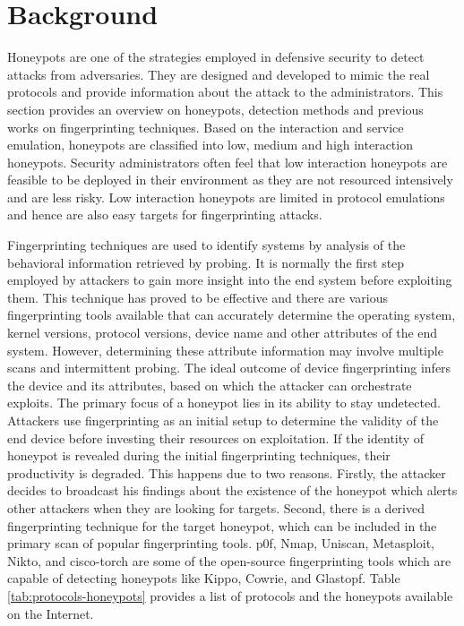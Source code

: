 \section{Background}
\label{sec:back}

Honeypots are one of the strategies employed in defensive security to detect attacks from adversaries. They are designed and developed to mimic the real protocols and provide information about the attack to the administrators. This section provides an overview on honeypots, detection methods and previous works on fingerprinting techniques. Based on the interaction and service emulation, honeypots are classified into low, medium and high interaction honeypots. Security administrators often feel that low interaction honeypots are feasible to be deployed in their environment as they are not resourced intensively and are less risky. Low interaction honeypots are limited in protocol emulations and hence are also easy targets for fingerprinting attacks. 

Fingerprinting techniques are used to identify systems by analysis of the behavioral information retrieved by probing. It is normally the first step employed by attackers to gain more insight into the end system before exploiting them. This technique has proved to be effective and there are various fingerprinting tools available that can accurately determine the operating system, kernel versions, protocol versions, device name and other attributes of the end system. However, determining these attribute information may involve multiple scans and intermittent probing. The ideal outcome of device fingerprinting infers the device and its attributes, based on which the attacker can orchestrate exploits. The primary focus of a honeypot lies in its ability to stay undetected. Attackers use fingerprinting as an initial setup to determine the validity of the end device before investing their resources on exploitation. If the identity of honeypot is revealed during the initial fingerprinting techniques, their productivity is degraded. This happens due to two reasons. Firstly, the attacker decides to broadcast his findings about the existence of the honeypot which alerts other attackers when they are looking for targets. Second, there is a derived fingerprinting technique for the target honeypot, which can be included in the primary scan of popular fingerprinting tools. p0f, Nmap, Uniscan, Metasploit, Nikto, and cisco-torch are some of the open-source fingerprinting tools which are capable of detecting honeypots like Kippo, Cowrie, and Glastopf. Table \ref{tab:protocols-honeypots} provides a list of protocols and the honeypots available on the Internet. 

